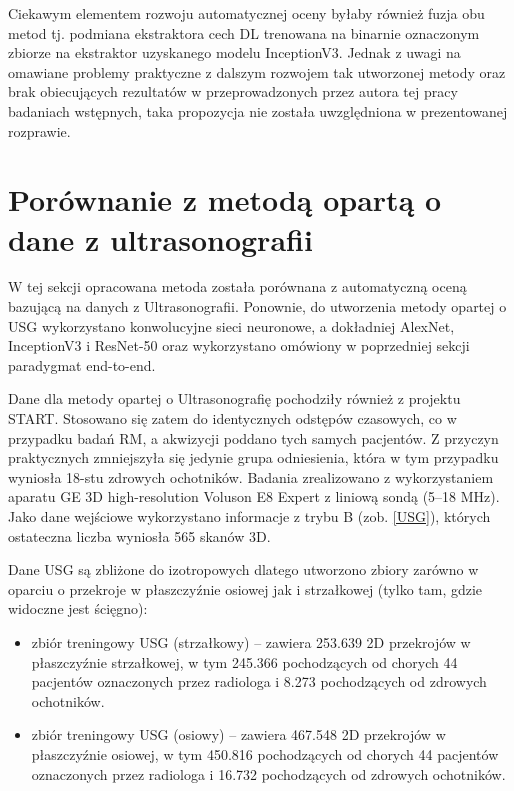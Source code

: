 Ciekawym elementem rozwoju automatycznej oceny byłaby również fuzja obu metod tj. podmiana ekstraktora cech DL trenowana na binarnie oznaczonym zbiorze na ekstraktor uzyskanego modelu InceptionV3. Jednak z uwagi na omawiane problemy praktyczne z dalszym rozwojem tak utworzonej metody oraz brak obiecujących rezultatów w przeprowadzonych przez autora tej pracy badaniach wstępnych, taka propozycja nie została uwzględniona w prezentowanej rozprawie. 

\section{Porównanie z metodą opartą o dane z ultrasonografii}
\label{seq:comp-usg}
W tej sekcji opracowana metoda została porównana z automatyczną oceną bazującą na danych z Ultrasonografii. Ponownie, do utworzenia metody opartej o USG wykorzystano konwolucyjne sieci neuronowe, a dokładniej AlexNet, InceptionV3 i ResNet-50 oraz wykorzystano omówiony w poprzedniej sekcji paradygmat end-to-end. 

Dane dla metody opartej o Ultrasonografię pochodziły również z projektu START. Stosowano się zatem do identycznych odstępów czasowych, co w przypadku badań RM, a akwizycji poddano tych samych pacjentów. Z przyczyn praktycznych zmniejszyła się jedynie grupa odniesienia, która w tym przypadku wyniosła 18-stu zdrowych ochotników. Badania zrealizowano z wykorzystaniem aparatu GE 3D high-resolution Voluson E8 Expert z liniową sondą (5--18 MHz). Jako dane wejściowe wykorzystano informacje z trybu B (zob. \ref{USG}), których ostateczna liczba wyniosła 565 skanów 3D. 

Dane USG są zbliżone do izotropowych dlatego utworzono zbiory zarówno w oparciu o przekroje w płaszczyźnie osiowej jak i strzałkowej (tylko tam, gdzie widoczne jest ścięgno):
\begin{itemize}
	\item zbiór treningowy USG (strzałkowy) -- zawiera 253.639 2D przekrojów w płaszczyźnie strzałkowej, w tym 245.366 pochodzących od chorych 44 pacjentów oznaczonych przez radiologa i 8.273 pochodzących od zdrowych ochotników.
	\item zbiór treningowy USG (osiowy) -- zawiera 467.548 2D przekrojów w płaszczyźnie osiowej, w tym 450.816 pochodzących od chorych 44 pacjentów oznaczonych przez radiologa i 16.732 pochodzących od zdrowych ochotników. 
\end{itemize}

